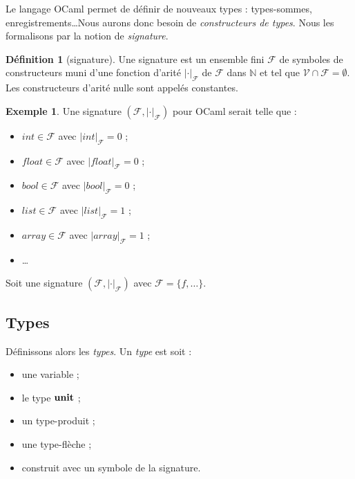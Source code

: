 \documentclass[a4paper]{report}
\theoremstyle{definition}
\newtheorem{definition}[theoreme]{Définition}
\newtheorem{exemple}[theoreme]{Exemple}
\newcommand{\unit}{\bold{unit}}
\newcommand{\V}{\mathscr{V}}
\newcommand{\F}{\mathscr{F}}
\begin{document}
Le langage OCaml permet de définir de nouveaux types : types-sommes, enregistrements\ldots Nous aurons donc besoin de \emph{constructeurs de types}. Nous les formalisons par la notion de \emph{signature}.

\begin{definition}[signature]
  Une signature est un ensemble fini $\F$ de symboles de constructeurs muni d'une fonction d'arité $| \cdot |_\F$ de $\F$ dans $\mathbb{N}$ et tel que $\V \cap \F = \emptyset$. Les constructeurs d'arité nulle sont appelés constantes.
\end{definition}

\begin{exemple}
  Une signature $( \F, | \cdot |_\F )$ pour OCaml serait telle que :
  \begin{itemize}
    \item $int \in \F$ avec $| int |_\F = 0$ ;
    \item $float \in \F$ avec $| float |_\F = 0$ ;
    \item $bool \in \F$ avec $| bool |_\F = 0$ ;
    \item $list \in \F$ avec $| list |_\F = 1$ ;
    \item $array \in \F$ avec $| array |_\F = 1$ ;
    \item \dots
  \end{itemize}
\end{exemple}

Soit une signature $( \F, | \cdot |_\F )$ avec $\F = \{ f, \dots \}$.


\subsection{Types}

Définissons alors les \emph{types}. Un \emph{type} est soit :
\begin{itemize}[nosep]
  \item une variable ;
  \item le type $\unit$ ;
  \item un type-produit ;
  \item une type-flèche ;
  \item construit avec un symbole de la signature.
\end{itemize}
\end{document}
